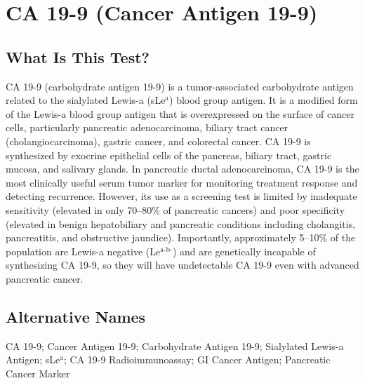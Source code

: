 \chapter{CA 19-9 (Cancer Antigen 19-9)}

\section*{What Is This Test?}
CA 19-9 (carbohydrate antigen 19-9) is a tumor-associated carbohydrate antigen related to the sialylated Lewis-a (sLe$^\text{a}$) blood group antigen. It is a modified form of the Lewis-a blood group antigen that is overexpressed on the surface of cancer cells, particularly pancreatic adenocarcinoma, biliary tract cancer (cholangiocarcinoma), gastric cancer, and colorectal cancer. CA 19-9 is synthesized by exocrine epithelial cells of the pancreas, biliary tract, gastric mucosa, and salivary glands. In pancreatic ductal adenocarcinoma, CA 19-9 is the most clinically useful serum tumor marker for monitoring treatment response and detecting recurrence. However, its use as a screening test is limited by inadequate sensitivity (elevated in only 70--80\% of pancreatic cancers) and poor specificity (elevated in benign hepatobiliary and pancreatic conditions including cholangitis, pancreatitis, and obstructive jaundice). Importantly, approximately 5--10\% of the population are Lewis-a negative (Le$^\text{a-b-}$) and are genetically incapable of synthesizing CA 19-9, so they will have undetectable CA 19-9 even with advanced pancreatic cancer.

\section*{Alternative Names}
CA 19-9; Cancer Antigen 19-9; Carbohydrate Antigen 19-9; Sialylated Lewis-a Antigen; sLe$^\text{a}$; CA 19-9 Radioimmunoassay; GI Cancer Antigen; Pancreatic Cancer Marker

